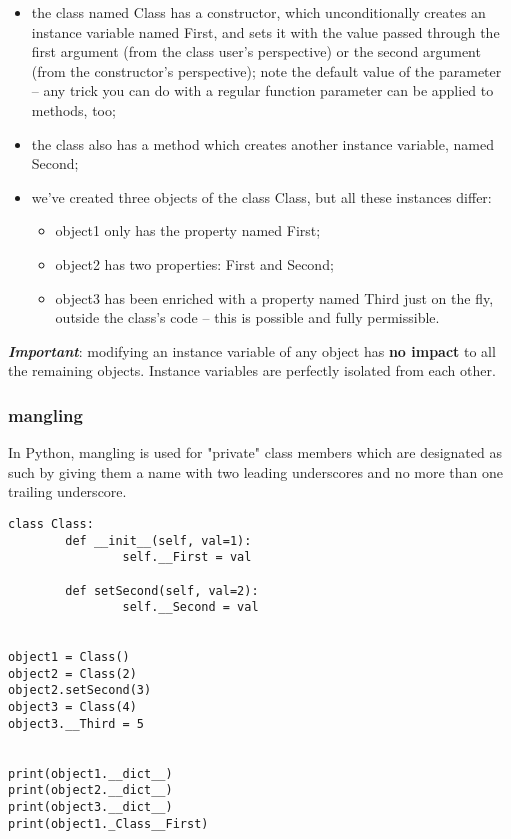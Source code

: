 \documentclass[11pt]{article}
\begin{document}
\begin{itemize}
\item the class named Class has a constructor, which unconditionally
creates an instance variable named First, and sets it with the value
passed through the first argument (from the class user’s
perspective) or the second argument (from the constructor’s
perspective); note the default value of the parameter – any trick
you can do with a regular function parameter can be applied to
methods, too;
\item the class also has a method which creates another instance variable,
named Second;
\item we’ve created three objects of the class Class, but all these
instances differ:
\begin{itemize}
\item object1 only has the property named First;
\item object2 has two properties: First and Second;
\item object3 has been enriched with a property named Third just on the
fly, outside the class’s code – this is possible and fully
permissible.
\end{itemize}
\end{itemize}

\emph{\textbf{Important}}: modifying an instance variable of any object has \textbf{no
impact} to all the remaining objects. Instance variables are perfectly
isolated from each other.

\subsubsection{mangling}
\label{sec:orgc7f57e3}
In Python, mangling is used for "private" class members which are
designated as such by giving them a name with two leading underscores
and no more than one trailing underscore.

\begin{verbatim}
class Class:
        def __init__(self, val=1):
                self.__First = val

        def setSecond(self, val=2):
                self.__Second = val


object1 = Class()
object2 = Class(2)
object2.setSecond(3)
object3 = Class(4)
object3.__Third = 5


print(object1.__dict__)
print(object2.__dict__)
print(object3.__dict__)
print(object1._Class__First)
\end{verbatim}
\end{document}
